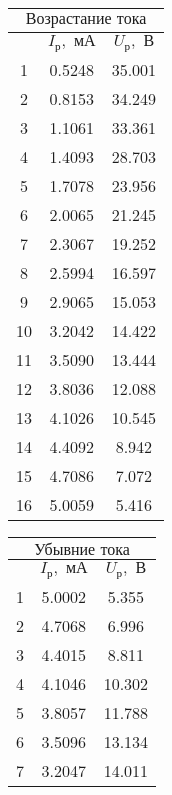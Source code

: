 \documentclass[a4paper,12pt]{article} %
\begin{document}
\begin{enumerate}
    \begin{table}[h]
	\centering
	\begin{tabular}{|c|c|c|}
            \hline
            \multicolumn{3}{|c|}{$\text{Возрастание тока}$} \\ \hline
		\hline
		& $ I_{\text{р}}, \text{ мА}$ & $ U_{\text{р}}, \text{ В}$ \\ \hline
		1 & 0.5248 & 35.001 \\ \hline
            2 & 0.8153 & 34.249 \\ \hline
            3 & 1.1061 & 33.361 \\ \hline
            4 & 1.4093 & 28.703 \\ \hline
            5 & 1.7078 & 23.956 \\ \hline
            6 & 2.0065 & 21.245 \\ \hline
            7 & 2.3067 & 19.252 \\ \hline
            8 & 2.5994 & 16.597 \\ \hline
            9 & 2.9065 & 15.053 \\ \hline
            10 & 3.2042 & 14.422 \\ \hline
            11 & 3.5090 & 13.444 \\ \hline
            12 & 3.8036 & 12.088 \\ \hline
            13 & 4.1026 & 10.545 \\ \hline
            14 & 4.4092 & 8.942 \\ \hline
            15 & 4.7086 & 7.072 \\ \hline
            16 & 5.0059 & 5.416 \\ \hline
	\end{tabular}
        \begin{tabular}{|c|c|c|}
            \hline
            \multicolumn{3}{|c|}{$\text{Убывние тока}$} \\ \hline
		\hline
		& $ I_{\text{р}}, \text{ мА}$ & $ U_{\text{р}}, \text{ В}$ \\ \hline
		1 & 5.0002 & 5.355 \\ \hline
            2 & 4.7068 & 6.996 \\ \hline
            3 & 4.4015 & 8.811 \\ \hline
            4 & 4.1046 & 10.302 \\ \hline
            5 & 3.8057 & 11.788 \\ \hline
            6 & 3.5096 & 13.134 \\ \hline
            7 & 3.2047 & 14.011 \\ \hline

\end{tabular}
\end{table}
\end{enumerate}
\end{document}
